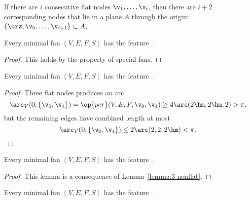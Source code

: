 If there are $i$ consecutive flat nodes $\v_1,\ldots,\v_i$, then there
are $i+2$ corresponding nodes that lie in a plane $A$ through the
origin: $\{\orz,\v_0,\ldots,\v_{i+1}\}\subset A$.

\begin{lemma}[]
Every minimal fan $(V,E,F,S)$ has the feature .
\end{lemma}

\begin{proof} This holds by the property  of special fans.
\end{proof}


\begin{lemma}[]
Every minimal fan $(V,E,F,S)$ has the feature .
\end{lemma}

\begin{proof}  Three flat nodes produces an arc
\begin{displaymath}
  \arc_V(0,\{\v_0,\v_4\}) 
= \op{per}(V,E,F,\v_0,\v_4) \ge4\arc(2\hm,2\hm,2) > \pi,
\end{displaymath}
but the remaining edges  have combined length at most
\begin{displaymath}
\arc_V(0,\{\v_0,\v_4\})\le 2\arc(2,2,2\hm) < \pi.
\end{displaymath}
\end{proof}

\begin{lemma}[]
Every minimal fan $(V,E,F,S)$ has the feature .
\end{lemma}

\begin{proof}  
This lemma is a consequence of Lemma~\ref{lemma:3-nonflat}.
\end{proof}



\begin{lemma}[]
Every minimal fan $(V,E,F,S)$ has the feature .
\end{lemma}

